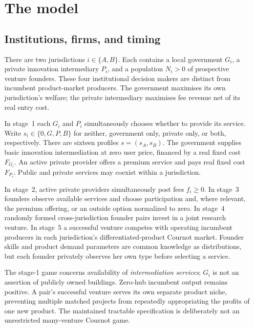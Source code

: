 \section{The model}\label{sec:model}

\subsection{Institutions, firms, and timing}
There are two jurisdictions $i\in\{A,B\}$. Each contains a local government $G_i$, a private innovation intermediary $P_i$, and a population $N_i>0$ of prospective venture founders. These four institutional decision makers are distinct from incumbent product-market producers. The government maximises its own jurisdiction's welfare; the private intermediary maximises fee revenue net of its real entry cost.

In stage~1 each $G_i$ and $P_i$ simultaneously chooses whether to provide its service. Write $s_i\in\{0,G,P,B\}$ for neither, government only, private only, or both, respectively. There are sixteen profiles $s=(s_A,s_B)$. The government supplies basic innovation intermediation at zero user price, financed by a real fixed cost $F_{G_i}$. An active private provider offers a premium service and pays real fixed cost $F_{P_i}$. Public and private services may coexist within a jurisdiction.

In stage~2, active private providers simultaneously post fees $f_i\geq0$. In stage~3 founders observe available services and choose participation and, where relevant, the premium offering, or an outside option normalized to zero. In stage~4 randomly formed cross-jurisdiction founder pairs invest in a joint research venture. In stage~5 a successful venture competes with operating incumbent producers in each jurisdiction's differentiated-product Cournot market. Founder skills and product demand parameters are common knowledge as distributions, but each founder privately observes her own type before selecting a service.

The stage-1 game concerns availability of \emph{intermediation services}; $G_i$ is not an assertion of publicly owned buildings. Zero-hub incumbent output remains positive. A pair's successful venture serves its own separate product niche, preventing multiple matched projects from repeatedly appropriating the profits of one new product. The maintained tractable specification is deliberately not an unrestricted many-venture Cournot game.

